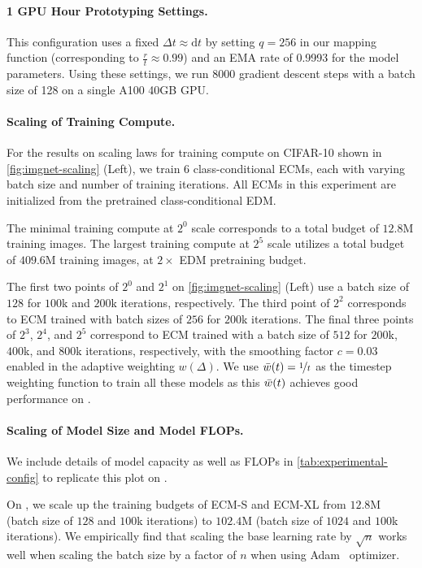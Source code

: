\paragraph{1 GPU Hour Prototyping Settings.} This configuration uses a fixed $\Delta t \approx \mathrm{d}t$ by setting $q=256$ in our mapping function (corresponding to $\frac{r}{t} \approx 0.99$) and an EMA rate of 0.9993 for the model parameters. Using these settings, we run $8000$ gradient descent steps with a batch size of 128 on a single A100 40GB GPU. 

\paragraph{Scaling of Training Compute.}
For the results on scaling laws for training compute on CIFAR-10 shown in \cref{fig:imgnet-scaling} (Left), we train 6 class-conditional ECMs, each with varying batch size and number of training iterations. 
All ECMs in this experiment are initialized from the pretrained class-conditional EDM.

The minimal training compute at $2^0$ scale corresponds to a total budget of $12.8\mathrm{M}$ training images. The largest training compute at $2^5$ scale utilizes a total budget of $409.6\mathrm{M}$ training images, at $2\times$ EDM pretraining budget.

The first two points of $2^0$ and $2^1$ on \cref{fig:imgnet-scaling} (Left) use a batch size of $128$ for $100$k and $200$k iterations, respectively.
The third point of $2^2$ corresponds to ECM trained with batch sizes of $256$ for $200$k iterations. 
The final three points of $2^3$, $2^4$, and $2^5$ correspond to ECM trained with a batch size of $512$ for $200$k, $400$k, and $800$k iterations, respectively, with the smoothing factor $c=0.03$ enabled in the adaptive weighting $w(\Delta)$.
We use $\Bar{w}(t) = \nicefrac{1}{t}$ as the timestep weighting function to train all these models as this $\Bar{w}(t)$ achieves good performance on \dino.

\paragraph{Scaling of Model Size and Model FLOPs.}
We include details of model capacity as well as FLOPs in \cref{tab:experimental-config} to replicate this plot on \imgnet. 

On \imgnet, we scale up the training budgets of ECM-S and ECM-XL from $12.8\mathrm{M}$ (batch size of $128$ and $100$k iterations) to $102.4\mathrm{M}$ (batch size of $1024$ and $100$k iterations). We empirically find that scaling the base learning rate by $\sqrt{n}$ works well when scaling the batch size by a factor of $n$ when using Adam~\citep{adam} optimizer.

